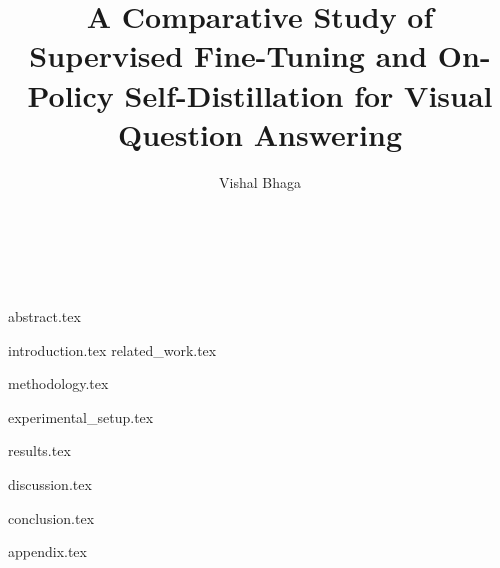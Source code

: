 \documentclass{sigkddExp}
\begin{document}
\title{A Comparative Study of Supervised Fine-Tuning and On-Policy Self-Distillation for Visual Question Answering}



\author{
\alignauthor Vishal Bhaga \\
       \\
       \\
       \\
}

\maketitle

{abstract.tex}

{introduction.tex}
\newpage
{related_work.tex}

{methodology.tex}

{experimental_setup.tex}

{results.tex}

{discussion.tex}

{conclusion.tex}

\printbibliography

{appendix.tex}
\end{document}

